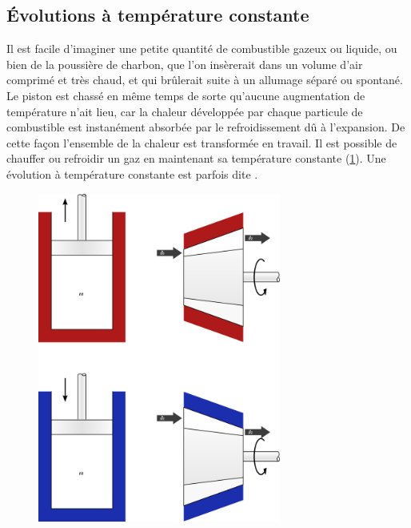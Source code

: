 	\subsection{Évolutions à température constante}
	\label{ch_gp_isothermes}
	
			Il est facile d’imaginer une petite quantité de combustible gazeux ou liquide, ou bien de la poussière de charbon, que l’on insèrerait dans un volume d’air comprimé et très chaud, et qui brûlerait suite à un allumage séparé ou spontané. Le piston est chassé en même temps de sorte qu’aucune augmentation de température n’ait lieu, car la chaleur développée par chaque particule de combustible est instanément absorbée par le refroidissement dû à l’expansion. De cette façon l’ensemble de la chaleur est transformée en travail.
		Il est possible de chauffer ou refroidir un gaz en maintenant sa température constante (\cref{fig_gp_température_constante}). Une évolution à température constante est parfois dite . 
		
		\begin{figure}
			\begin{center}
				\includegraphics[width=8cm]{images/temperature_constante.png}
			\end{center}
			\label{fig_gp_température_constante}
		\end{figure}
		
